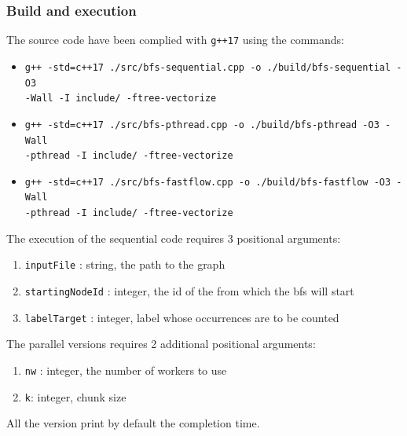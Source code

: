 \subsubsection{Build and execution}
The source code have been complied with \texttt{g++17} using the commands:
\begin{itemize}
    \item \texttt{g++ -std=c++17  ./src/bfs-sequential.cpp -o ./build/bfs-sequential -O3} \\ \texttt{-Wall -I include/ -ftree-vectorize }
    \item \texttt{g++ -std=c++17  ./src/bfs-pthread.cpp -o ./build/bfs-pthread -O3 -Wall} \\ \texttt{-pthread -I include/ -ftree-vectorize }
    \item \texttt{g++ -std=c++17  ./src/bfs-fastflow.cpp -o ./build/bfs-fastflow -O3 -Wall}\\ \texttt{-pthread -I include/ -ftree-vectorize }
\end{itemize}
The execution of the sequential code requires 3 positional arguments:
\begin{enumerate}
    \item \texttt{inputFile} : string, the path to the graph
    \item \texttt{startingNodeId} : integer, the id of the from which the bfs will start
    \item \texttt{labelTarget} : integer, label whose occurrences are to be counted
\end{enumerate}
The parallel versions requires 2 additional positional arguments:
\begin{enumerate}
    \item \texttt{nw} : integer, the number of workers to use
    \item \texttt{k}: integer, chunk size
\end{enumerate}
All the version print by default the completion time.
